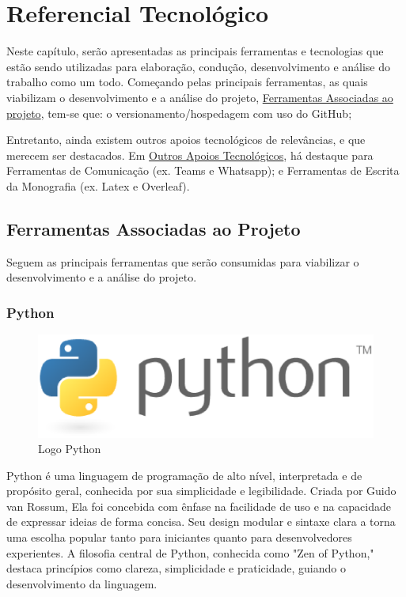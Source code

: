 \chapter[Referencial Tecnológico]{Referencial Tecnológico}
\label{chap:tecnologico}

Neste capítulo, serão apresentadas as principais ferramentas e tecnologias que estão sendo utilizadas para elaboração, condução, desenvolvimento e análise do trabalho como um todo. Começando pelas principais ferramentas, as quais viabilizam o desenvolvimento e a análise do projeto, \hyperref[sec:principal]{Ferramentas Associadas ao projeto}, tem-se que: o versionamento/hospedagem com uso do GitHub; 

Entretanto, ainda existem outros apoios tecnológicos de relevâncias, e que merecem ser destacados. Em \hyperref[sec:demais]{Outros Apoios Tecnológicos}, há destaque para Ferramentas de Comunicação (ex. Teams e Whatsapp); e Ferramentas de Escrita da Monografia 
(ex. Latex e Overleaf).

\section{Ferramentas Associadas ao Projeto}
\label{sec:principal}

Seguem as principais ferramentas que serão consumidas para viabilizar o desenvolvimento e a análise do projeto.

\subsection{Python}

\begin{figure}[ht]
    \centering
    \includegraphics[scale=0.25]{figuras/referencialTecnologico/python.eps}
    \caption{Logo Python}
    \label{fig:python}
\end{figure}

Python é uma linguagem de programação de alto nível, interpretada e de propósito geral, conhecida por sua simplicidade e legibilidade. Criada por Guido van Rossum, Ela foi concebida com ênfase na facilidade de uso e na capacidade de expressar ideias de forma concisa. Seu design modular e sintaxe clara a torna uma escolha popular tanto para iniciantes quanto para desenvolvedores experientes. A filosofia central de Python, conhecida como "Zen of Python," destaca princípios como clareza, simplicidade e praticidade, guiando o desenvolvimento da linguagem.

